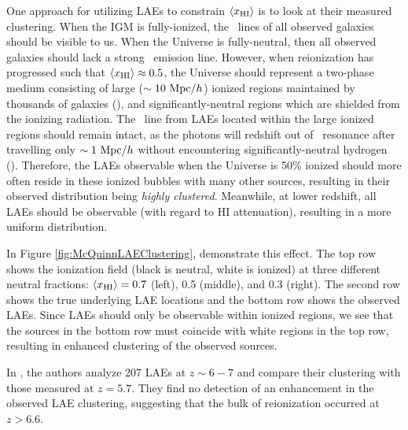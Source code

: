 One approach for utilizing LAEs to constrain $\langle x_{\text{HI}}\rangle$ is to look at their measured clustering. When the IGM is fully-ionized, the \lya\ lines of all observed galaxies should be visible to us. When the Universe is fully-neutral, then all observed galaxies should lack a strong \lya\ emission line. However, when reionization has progressed such that $\langle x_{\text{HI}}\rangle \approx 0.5$, the Universe should represent a two-phase medium consisting of large ($\sim 10\ \text{Mpc/$h$}$) ionized regions maintained by thousands of galaxies (\citealt{McQuinn:2007dy}), and significantly-neutral regions which are shielded from the ionizing radiation. The \lya\ line from LAEs located within the large ionized regions should remain intact, as the photons will redshift out of \lya\ resonance after travelling only $\sim 1\ \text{Mpc/$h$}$ without encountering significantly-neutral hydrogen (\citealt{finlator2012recent}). Therefore, the LAEs observable when the Universe is 50\% ionized should more often reside in these ionized bubbles with many other sources, resulting in their observed distribution being \textit{highly clustered}. Meanwhile, at lower redshift, all LAEs should be observable (with regard to HI attenuation), resulting in a more uniform distribution.

In Figure \ref{fig:McQuinnLAEClustering}, \cite{McQuinn:2007dy} demonstrate this effect. The top row shows the ionization field (black is neutral, white is ionized) at three different neutral fractions: $\langle x_{\text{HI}}\rangle = 0.7$ (left), 0.5 (middle), and 0.3 (right). The second row shows the true underlying LAE locations and the bottom row shows the observed LAEs. Since LAEs should only be observable within ionized regions, we see that the sources in the bottom row must coincide with white regions in the top row, resulting in enhanced clustering of the observed sources.

In \cite{Ouchi2010}, the authors analyze 207 LAEs at $z \sim 6-7$ and compare their clustering with those measured at $z = 5.7$. They find no detection of an enhancement in the observed LAE clustering, suggesting that the bulk of reionization occurred at $z > 6.6$. 



